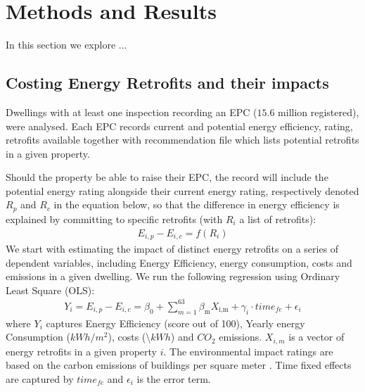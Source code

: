 

\section{Methods and Results}

In this section we explore ...

\subsection{Costing Energy Retrofits and their impacts}
Dwellings with at least one inspection recording an EPC ($15.6$ million registered), were analysed. Each EPC records current and potential energy efficiency, rating, retrofits available together with recommendation file which lists potential retrofits in a given property.

Should the property be able to raise their EPC, the record will include the potential energy rating alongside their current energy rating, respectively denoted $R_p$ and $R_c$ in the equation below, so that the difference in energy efficiency is explained by committing to specific retrofits (with $R_i$ a list of retrofits):
\begin{align*}
    E_{i,p} - E_{i,c} = f(R_{i})
\end{align*}
\noindent We start with estimating the impact of distinct energy retrofits on a series of dependent variables, including Energy Efficiency, energy consumption, costs and emissions in a given dwelling. We run the following regression using Ordinary Least Square (OLS):
\begin{align}
    Y_i = E_{i,p} -E_{i,c} = \beta_0 + \sum_{m=1}^{63} \beta_{\text{m}} X_{\text{i,m}}  + \gamma_i \cdot time_{fe} +  \epsilon_i
\label{eq:general_impacts_OLS}
\end{align}
where $Y_i$ captures Energy Efficiency (score out of 100), Yearly energy Consumption ($kWh/m^2$), costs (\textsterling  \textbackslash $kWh$) and $CO_2$ emissions. $X_{i,m}$ is a vector of energy retrofits in a given property $i$. The environmental impact ratings are based on the carbon emissions of buildings per square meter \cite{rowe_housing_2024}. Time fixed effects are captured by $time_{fe}$ and $\epsilon_i$ is the error term. \\


